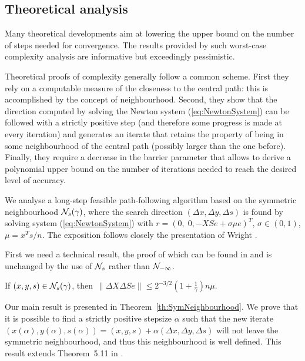 %
%
\subsection{Theoretical analysis}

Many theoretical developments aim at lowering the upper bound on the number 
of steps needed for convergence. The results provided by such worst-case 
complexity analysis are informative but exceedingly pessimistic. 

Theoretical proofs of complexity generally follow a common scheme.
First they rely on a computable measure of the closeness to the central
path: this is accomplished by the concept of neighbourhood. Second,
they show that the direction computed by solving the Newton system
(\ref{eq:NewtonSystem}) can be followed with a strictly positive step
(and therefore some progress is made at every iteration) 
and generates an iterate 
that retains the property of being in some neighbourhood of the central 
path (possibly larger than the one before). Finally, they require
a decrease in the barrier parameter that allows to derive a polynomial upper
bound on the number of iterations needed to reach the desired
level of accuracy.

We analyse a long-step feasible path-following 
algorithm based on the symmetric neighbourhood $\mathcal{N}_s(\gamma)$, 
where the search direction $(\Delta x, \Delta y, \Delta s)$ 
is found by solving system (\ref{eq:NewtonSystem}) with 
$r=(0,\; 0,-XSe+\sigma\mu e)^T$, $\sigma\in(0,1)$, $\mu=x^Ts/n$.
The exposition follows closely the presentation of Wright
\cite[Chapter~5]{ipm:Wright97}. 

First we need a technical result, the proof of which can be found 
in \cite[Lemma~5.10]{ipm:Wright97} and is unchanged by the use 
of $\mathcal{N}_s$ rather than $\mathcal{N}_{-\infty}$.
%
\begin{lemma} \label{Wright:5.10}
If $(x,y,s)\in \mathcal{N}_s(\gamma)$, then\,
\(
  \|\Delta X\Delta Se\| \le 2^{-3/2}\left( 1+ \displaystyle{\frac{1}{\gamma}} \right)n\mu.
\)
\end{lemma}

Our main result is presented in Theorem~\ref{th:SymNeighbourhood}. 
We prove that it is possible to find a strictly positive stepsize 
$\alpha$ such that the new iterate 
$(x(\alpha),y(\alpha),s(\alpha))=(x,y,s)+\alpha(\Delta x,\Delta y,\Delta s)$
will not leave the symmetric neighbourhood, and thus this 
neighbourhood is well defined. This result extends 
Theorem~5.11 in \cite{ipm:Wright97}.

